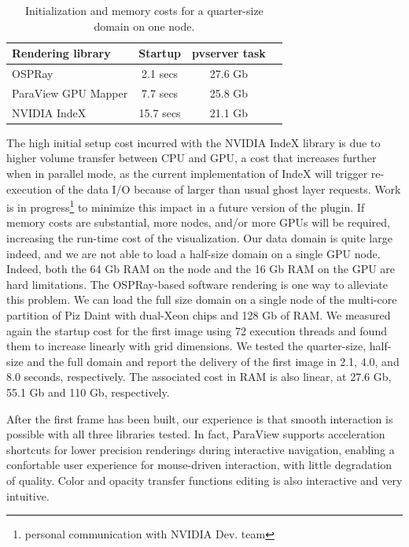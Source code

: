\documentclass[final,5p,times,twocolumn]{elsarticle}
\begin{document}
\begin{table}[htb]
  \centering
  \caption{
    Initialization and memory costs for a quarter-size domain on one node.
  }
  \label{tab:firstframe-tab}

  \begin{tabular}{lccc}
    \hline
    Rendering library & Startup & pvserver task\\
    \hline
    OSPRay & 2.1 secs &  27.6 Gb \\
    ParaView GPU Mapper & 7.7 secs &  25.8 Gb \\
    NVIDIA IndeX & 15.7 secs &  21.1 Gb\\
    \hline

  \end{tabular}
\end{table}

The high initial setup cost incurred with the NVIDIA IndeX library is due to higher volume transfer between CPU and GPU, a cost that increases further when in parallel mode, as the current
implementation of IndeX will trigger re-execution of the data I/O because of larger than usual ghost layer requests. Work is in progress\footnote{personal communication with NVIDIA Dev. team} to minimize this impact in a future version of the plugin.
\newline
If memory costs are substantial, more nodes, and/or more GPUs will be required,
increasing the run-time cost of the visualization. Our data domain is quite large
indeed, and we are not able to load a half-size domain on a single GPU node. Indeed, both
the 64 Gb RAM on the node and the 16 Gb RAM on the GPU are hard limitations. The OSPRay-based software rendering is one way to alleviate this problem. We can load the full size
domain on a single node of  the multi-core partition of Piz Daint with dual-Xeon
chips and 128 Gb of RAM. We measured again the startup cost for the first image
using 72 execution threads and found them to increase linearly with grid dimensions.
We tested the quarter-size, half-size and the full domain and report the delivery
of the first image in 2.1, 4.0, and 8.0 seconds, respectively. The associated cost
in RAM is also linear, at 27.6 Gb, 55.1 Gb and 110 Gb, respectively.
 
After the first frame has been built, our experience is that smooth interaction
is possible with all three libraries tested. In fact, ParaView supports acceleration
shortcuts for lower precision renderings during interactive navigation,
enabling a confortable user experience for mouse-driven interaction,
with little degradation of quality. 
Color and opacity transfer functions editing is also interactive and very intuitive.
\end{document}
